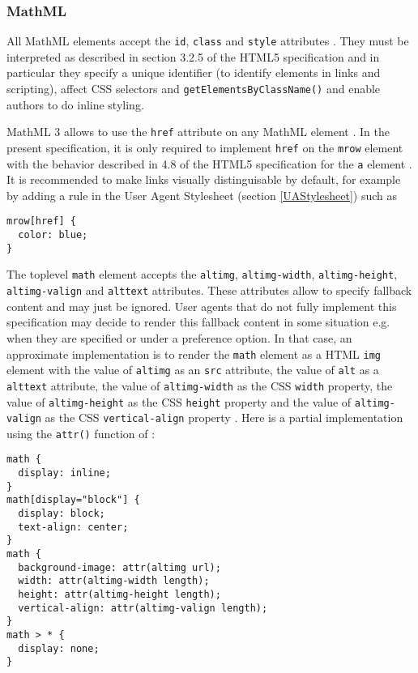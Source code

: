 \subsubsection{MathML}

All MathML elements accept the {\tt id}, {\tt class} and {\tt style} attributes
\cite{MathML3}. They must be interpreted as described in section 3.2.5 of the
HTML5 specification \cite{HTML5} and in particular they specify a unique
identifier (to identify elements in links and scripting), affect
CSS selectors and {\tt getElementsByClassName()} and enable authors to do
inline styling.

MathML 3 allows to use the {\tt href} attribute on any MathML element
\cite{MathML3}. In the present specification, it is only required to implement
{\tt href} on the {\tt mrow} element with the behavior described in 4.8
of the HTML5 specification for the {\tt a} element \cite{HTML5}. It is
recommended to make links visually distinguisable by default, for example by
adding a rule in the User Agent Stylesheet (section \ref{UAStylesheet}) such as
\begin{lstlisting}
mrow[href] {
  color: blue;
}
\end{lstlisting}

The toplevel {\tt math} element accepts the {\tt altimg}, {\tt altimg-width},
{\tt altimg-height}, {\tt altimg-valign} and {\tt alttext} attributes.
These attributes allow to specify fallback content and may just be ignored.
User agents that do not fully implement this specification may decide to
render this fallback content in some situation e.g. when they are specified or
under a preference option. In that case, an approximate implementation is to
render the {\tt math} element as a HTML {\tt img} element with the
value of {\tt altimg} as an {\tt src} attribute, the value of
{\tt alt} as a {\tt alttext} attribute, the value of {\tt altimg-width} as
the CSS {\tt width} property, the value of {\tt altimg-height} as
the CSS {\tt height} property and the value of {\tt altimg-valign} as
the CSS {\tt vertical-align} property \cite{HTML5} \cite{CSS2}. Here is a
partial implementation using the {\tt attr()} function of \cite{CSS3Values}:
%
\begin{lstlisting}
math {
  display: inline;
}
math[display="block"] {
  display: block;
  text-align: center;
}
math {
  background-image: attr(altimg url);
  width: attr(altimg-width length);
  height: attr(altimg-height length);
  vertical-align: attr(altimg-valign length);
}
math > * {
  display: none;
}
\end{lstlisting}


